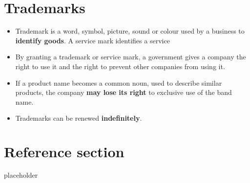 \documentclass{article}
\begin{document}
\section{Trademarks}
\begin{itemize}
  \item Trademark is a word, symbol, picture, sound or colour used by a business to \textbf{identify goods}. A service mark identifies a service 
  \item By granting a trademark or service mark, a government gives a company the right to use it and the right to prevent other companies from using it. 
  \item If a product name becomes a common noun, used to describe similar products, the company \textbf{may lose its right} to exclusive use of the band name. 
  \item Trademarks can be renewed \textbf{indefinitely}.
\end{itemize}

\pagebreak

\section*{Reference section} \label{sec:reference}
\begin{description}
	\item[placeholder] \hfill \\
\end{description}
\end{document}
